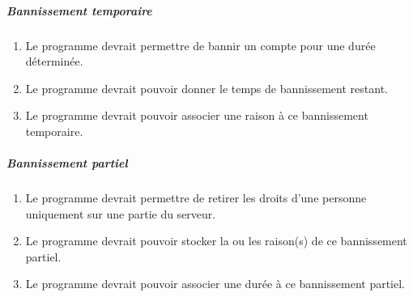 \documentclass[10pt,a4paper]{report}
\begin{document}
	\subparagraph{Bannissement temporaire}
		\begin{enumerate}
			\item Le programme devrait permettre de bannir un compte pour une durée déterminée.
			\item Le programme devrait pouvoir donner le temps de bannissement restant.
			\item Le programme devrait pouvoir associer une raison à ce bannissement temporaire.
		\end{enumerate}
		
	\subparagraph{Bannissement partiel}
		\begin{enumerate}
			\item Le programme devrait permettre de retirer les droits d'une personne uniquement sur une partie du serveur.
			\item Le programme devrait pouvoir stocker la ou les raison(s) de ce bannissement partiel.
			\item Le programme devrait pouvoir associer une durée à ce bannissement partiel.
		\end{enumerate}
	
\end{document}
